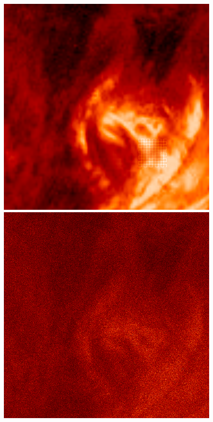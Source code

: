 \documentclass[tocnosub,noragright,centerchapter,12pt]{uiucecethesis09}
\begin{document}
\begin{figure}[h]
  \centering
  \begin{minipage}{.3\textwidth}
    \centering
    \includegraphics[width=1\textwidth]{figures/aia_truth.png}
  \end{minipage}
  \begin{minipage}{.3\textwidth}
    \centering
    \includegraphics[width=1\textwidth]{figures/aia_frame.png}

\end{minipage}
\end{figure}
\end{document}
